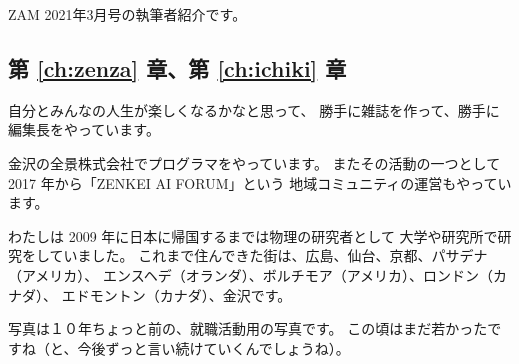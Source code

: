 \documentclass[dvipdfmx,autodetect-engine,10pt,b5paper,papersize,openany,dvipsnames]{jsbook}
\begin{document}
{\small
ZAM 2021年3月号の執筆者紹介です。

\subsection*{第 \ref{ch:zenza} 章、第 \ref{ch:ichiki} 章\\ }

自分とみんなの人生が楽しくなるかなと思って、
勝手に雑誌を作って、勝手に編集長をやっています。

金沢の全景株式会社でプログラマをやっています。
またその活動の一つとして 2017 年から「ZENKEI AI FORUM」という
地域コミュニティの運営もやっています。

わたしは 2009 年に日本に帰国するまでは物理の研究者として
大学や研究所で研究をしていました。
これまで住んできた街は、広島、仙台、京都、パサデナ（アメリカ）、
エンスヘデ（オランダ）、ボルチモア（アメリカ）、ロンドン（カナダ）、
エドモントン（カナダ）、金沢です。

写真は１０年ちょっと前の、就職活動用の写真です。
この頃はまだ若かったですね（と、今後ずっと言い続けていくんでしょうね）。

}
\end{document}
